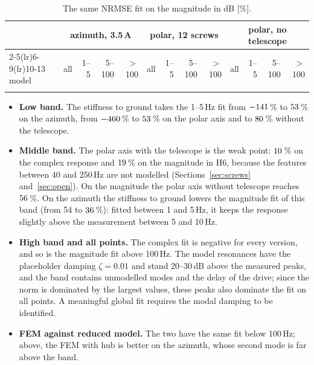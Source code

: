\documentclass[10pt,a4paper]{article}
\numberwithin{equation}{section}
\begin{document}
\begin{table}[H]\centering\scriptsize\setlength{\tabcolsep}{3pt}
\caption{The same NRMSE fit on the magnitude in dB [\%].}\label{tab:fit_db}
\begin{tabular}{lrrrrrrrrrrrr}\toprule
& \multicolumn{4}{c}{azimuth, 3.5\,A} & \multicolumn{4}{c}{polar, 12 screws} & \multicolumn{4}{c}{polar, no telescope} \\ \cmidrule(lr){2-5}\cmidrule(lr){6-9}\cmidrule(lr){10-13}
model & all & 1--5 & 5--100 & $>$100 & all & 1--5 & 5--100 & $>$100 & all & 1--5 & 5--100 & $>$100 \\ \midrule
\\ \bottomrule
\end{tabular}\end{table}
\begin{itemize}
\item \textbf{Low band.} The stiffness to ground takes the 1--5\,Hz fit from $-141$\,\% to $53$\,\% on the azimuth, from $-460$\,\% to $53$\,\% on the polar axis and to $80$\,\% without the telescope.
\item \textbf{Middle band.} The polar axis with the telescope is the weak point: $10$\,\% on the complex response and $19$\,\% on the magnitude in H6, because the features between 40 and 250\,Hz are not modelled (Sections~\ref{sec:screws} and~\ref{sec:open}). On the magnitude the polar axis without telescope reaches $56$\,\%. On the azimuth the stiffness to ground lowers the magnitude fit of this band (from 54 to $36$\,\%): fitted between 1 and 5\,Hz, it keeps the response slightly above the measurement between 5 and 10\,Hz.
\item \textbf{High band and all points.} The complex fit is negative for every version, and so is the magnitude fit above 100\,Hz. The model resonances have the placeholder damping $\zeta = 0.01$ and stand 20--30\,dB above the measured peaks, and the band contains unmodelled modes and the delay of the drive; since the norm is dominated by the largest values, these peaks also dominate the fit on all points. A meaningful global fit requires the modal damping to be identified.
\item \textbf{FEM against reduced model.} The two have the same fit below 100\,Hz; above, the FEM with hub is better on the azimuth, whose second mode is far above the band.
\end{itemize}

\end{document}
